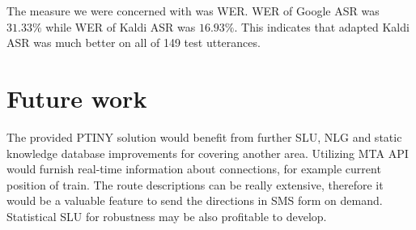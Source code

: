 The measure we were concerned with was \acf{WER}.
\ac{WER} of Google \ac{ASR} was $31.33\%$ while \ac{WER} of Kaldi \ac{ASR} was $16.93\%$.
This indicates that adapted Kaldi \ac{ASR} was much better on all of 149 test utterances.

\section{Future work}

The provided \ac{PTINY} solution would benefit from further \ac{SLU}, \ac{NLG}  and static knowledge database improvements for covering another area.
Utilizing \ac{MTA} \ac{API} would furnish real-time information about connections, for example current position of train.
The route descriptions can be really extensive, therefore it would be a valuable feature to send the directions in SMS form on demand.
Statistical \ac{SLU} for robustness may be also profitable to develop.
